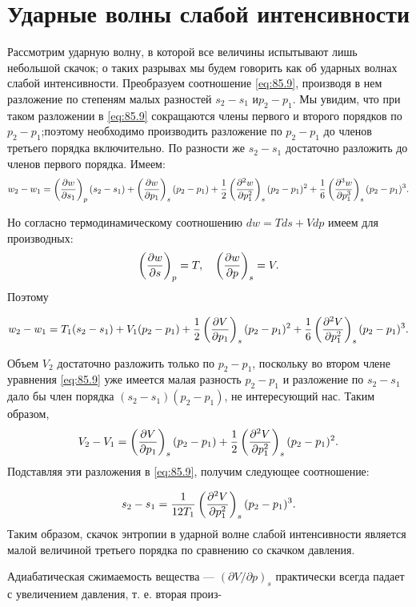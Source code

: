 \section{Ударные волны слабой интенсивности}\label{sec:p86}

Рассмотрим ударную волну, в которой все величины испытывают лишь небольшой
скачок; о таких разрывах мы будем говорить как об ударных волнах слабой
интенсивности. Преобразуем соотношение \ref{eq:85.9}, производя в нем разложение по
степеням малых разностей $s_2-s_1$ и$p_2-p_1$. Мы увидим, что при таком разложении
в \ref{eq:85.9} сокращаются члены первого и второго порядков по $p_2-p_1$;поэтому
необходимо производить разложение по $p_2-p_1$ до членов третьего порядка
включительно. По разности же $s_2-s_1$ достаточно разложить до членов первого
порядка. Имеем:
\[
w_2 - w_1 = \left( \frac{\partial{w}}{\partial{s_1}} \right)_{p}(s_2-s_1)+\left( \frac{\partial{w}}{\partial{p_1}} \right)_{s}(p_2-p_1)+\frac{1}{2} \left( \frac{\partial{^2 w}}{\partial{p^2_1}} \right)_{s}(p_2-p_1)^2 + \frac{1}{6}\left( \frac{\partial{^3 w}}{\partial{p^3_1}} \right)_{s}(p_2-p_1)^3.
\]

Но согласно термодинамическому соотношению $dw=Tds+Vdp$ имеем для производных:
\[
\left( \frac{\partial{w}}{\partial{s}} \right)_{p} = T, \quad \left( \frac{\partial{w}}{\partial{p}} \right)_{s} = V.
\]
Поэтому

\[
w_2-w_1 = T_1(s_2-s_1) + V_1(p_2-p_1) + \frac{1}{2}\left( \frac{\partial{V}}{\partial{p_1}} \right)_{s}(p_2-p_1)^2+\frac{1}{6} \left( \frac{\partial{^2 V}}{\partial{p^2_1}} \right)_{s}(p_2-p_1)^3.
\]

Объем $V_2$ достаточно разложить только по $p_2-p_1$, поскольку во втором члене
уравнения \ref{eq:85.9} уже имеется малая разность $p_2-p_1$ и разложение по
$s_2-s_1$ дало бы член порядка $(s_2-s_1)(p_2-p_1)$, не интересующий нас. Таким
образом,
\[
V_2-V_1 = \left( \frac{\partial{V}}{\partial{p_1}} \right)_{s}(p_2-p_1)+\frac{1}{2}\left( \frac{\partial{^2V}}{\partial{p^2_1}} \right)_{s}(p_2-p_1)^2.
\]
Подставляя эти разложения в \ref{eq:85.9}, получим следующее соотношение:

\begin{equation}
	\label{eq:86.1}
	s_2-s_1 = \frac1{12T_1}\left( \frac{\partial{^2V}}{\partial{p^2_1}} \right)_{s}(p_2-p_1)^3.
\end{equation}
Таким образом, скачок энтропии в ударной волне слабой интенсивности является
малой величиной третьего порядка по сравнению со скачком давления.

Адиабатическая сжимаемость вещества — $(\partial V/\partial p)_s$ практически
всегда падает с увеличением давления, т. е. вторая произ-

